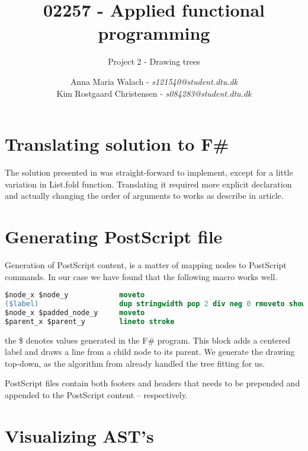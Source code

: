 \documentclass[10pt]{scrartcl}
\title{02257 - Applied functional programming}
\subtitle{Project 2 - Drawing trees}
\author{Anna Maria Walach - \textit {s121540@student.dtu.dk} \\ Kim Rostgaard Christensen - \textit {s084283@student.dtu.dk}}
\begin{document}
\maketitle
\section{Translating solution to F\#}
The solution presented in \cite{kennedy1996functional} was straight-forward to implement, except for a little variation in List.fold function. Translating it required more explicit declaration and actually changing the order of arguments to works as describe in article.
\section{Generating PostScript file}
Generation of PostScript content, is a matter of mapping nodes to PostScript commands. In our case we have found that the following macro works well.
\begin{lstlisting}[language=PostScript]
$node_x $node_y            moveto
($label)                   dup stringwidth pop 2 div neg 0 rmoveto show
$node_x $padded_node_y     moveto
$parent_x $parent_y        lineto stroke
\end{lstlisting}
the \$ denotes values generated in the F\# program. This block adds a centered label and draws a line from a child node to its parent.
We generate the drawing top-down, as the algorithm from \cite{kennedy1996functional} already handled the tree fitting for us.

PostScript files contain both footers and headers that needs to be prepended and appended to the PostScript content -- respectively.
\section{Visualizing AST's}
\end{document}
